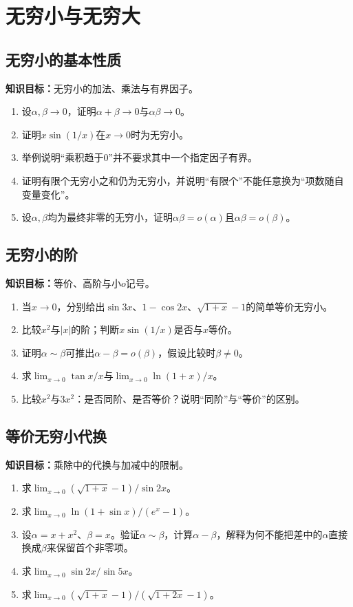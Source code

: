 \documentclass[11pt,a4paper,fontset=fandol]{ctexrep}
\newcommand{\goal}[1]{\textbf{知识目标：}#1\par}
\begin{document}
\section{无穷小与无穷大}
\subsection{无穷小的基本性质}
\goal{无穷小的加法、乘法与有界因子。}
\begin{enumerate}
\item 设$\alpha,\beta\to0$，证明$\alpha+\beta\to0$与$\alpha\beta\to0$。
\item 证明$x\sin(1/x)$在$x\to0$时为无穷小。
\item 举例说明“乘积趋于0”并不要求其中一个指定因子有界。
\item 证明有限个无穷小之和仍为无穷小，并说明“有限个”不能任意换为“项数随自变量变化”。
\item 设$\alpha,\beta$均为最终非零的无穷小，证明$\alpha\beta=o(\alpha)$且$\alpha\beta=o(\beta)$。
\end{enumerate}
\subsection{无穷小的阶}
\goal{等价、高阶与小$o$记号。}
\begin{enumerate}
\item 当$x\to0$，分别给出$\sin3x$、$1-\cos2x$、$\sqrt{1+x}-1$的简单等价无穷小。
\item 比较$x^2$与$|x|$的阶；判断$x\sin(1/x)$是否与$x$等价。
\item 证明$\alpha\sim\beta$可推出$\alpha-\beta=o(\beta)$，假设比较时$\beta\ne0$。
\item 求$\lim_{x\to0}\tan x/x$与$\lim_{x\to0}\ln(1+x)/x$。
\item 比较$x^2$与$3x^2$：是否同阶、是否等价？说明“同阶”与“等价”的区别。
\end{enumerate}
\subsection{等价无穷小代换}
\goal{乘除中的代换与加减中的限制。}
\begin{enumerate}
\item 求$\lim_{x\to0}(\sqrt{1+x}-1)/\sin2x$。
\item 求$\lim_{x\to0}\ln(1+\sin x)/(e^x-1)$。
\item 设$\alpha=x+x^2$、$\beta=x$。验证$\alpha\sim\beta$，计算$\alpha-\beta$，解释为何不能把差中的$\alpha$直接换成$\beta$来保留首个非零项。
\item 求$\lim_{x\to0}\sin2x/\sin5x$。
\item 求$\lim_{x\to0}(\sqrt{1+x}-1)/(\sqrt{1+2x}-1)$。
\end{enumerate}
\end{document}
